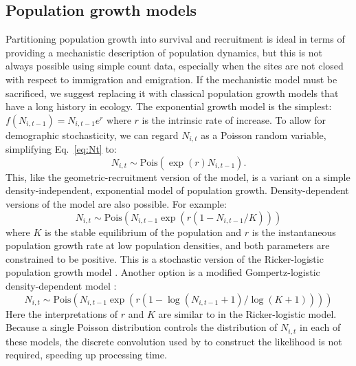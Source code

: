 \documentclass[12pt]{article}
\begin{document}
\subsection{Population growth models}


Partitioning population growth into survival and recruitment
is ideal in terms of providing a mechanistic description of population
dynamics, but this is not always possible using simple count data,
especially when the sites are not closed with respect to immigration
and emigration. %
If the mechanistic model must be sacrificed, we suggest replacing it
with classical population growth models that have a long history in
ecology. The exponential growth model is the simplest: 
$f(N_{i,t-1}) = N_{i,t-1}e^r$ where $r$ is the intrinsic
rate of increase. %
To allow for demographic stochasticity, we can regard $N_{i,t}$ as a Poisson 
random variable, simplifying Eq.~\ref{eq:Nt} to:
\begin{equation}
  N_{i,t} \sim \mathrm{Pois}(\exp(r)N_{i,t-1}).
\label{eq:exp}
\end{equation}
This,
like the geometric-recruitment version of the model, is a variant on a simple
density-independent, exponential model of population growth.
Density-dependent versions of the model are also possible.  For
example:
\begin{equation}
  N_{i,t} \sim \mathrm{Pois}(N_{i,t-1}\exp(r(1-N_{i,t-1}/K)))
\label{eq:rick}
\end{equation}
where $K$ is the stable equilibrium of the population and $r$ is
the instantaneous population growth rate at low population
densities, and both parameters are constrained to be positive. This is
a stochastic version of the Ricker-logistic population growth model
\citep{ricker:1954}. Another option is a modified Gompertz-logistic
density-dependent model \citep{hart_gotelli:2011}:
\begin{equation}
N_{i,t} \sim \mathrm{Pois}(N_{i,t-1}\exp(r(1-\log(N_{i,t-1}+1)/\log(K+1))))
\label{eq:gomp}
\end{equation}
Here the interpretations of $r$ and $K$ are similar to in the
Ricker-logistic model. Because a single Poisson distribution controls
the distribution of $N_{i,t}$ in each of these models, the discrete 
convolution used by \citet{dail_madsen:2011} to construct the
likelihood is not required, speeding up processing time.
\end{document}
